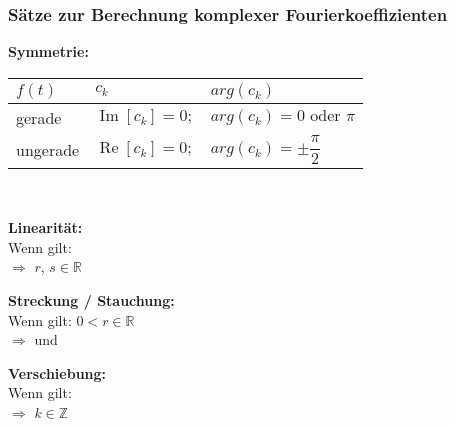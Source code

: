 			\subsubsection{Sätze zur Berechnung komplexer Fourierkoeffizienten}
				\begin{minipage}[t]{0.5\textwidth}
					\textbf{Symmetrie:}\\[3pt]
					\renewcommand{\arraystretch}{1.5}
						\begin{tabular}{|l|l|l|}
							\hline
							$f(t)$ & $c_k$ & $arg(c_k)$\\[3pt]
							\hline
							gerade & $\displaystyle \operatorname{Im}[c_k] = 0 ;$ & $\displaystyle arg(c_k) = 0 \text{ oder } \pi$\\[3pt]
							\hline
							ungerade & $\displaystyle \operatorname{Re}[c_k] = 0 ;$ & $\displaystyle arg(c_k) = \pm \dfrac{\pi}{2}$\\[3pt]
							\hline
						\end{tabular}\\[6pt]
					\renewcommand{\arraystretch}{1}
				\end{minipage}
				\begin{minipage}[t]{0.5\textwidth}
					\textbf{Linearität:}\\[3pt]
					Wenn gilt: \\[3pt]
					$\Rightarrow$  $r$, $s \in \mathbb{R}$\\[6pt]
				\end{minipage}
				\begin{minipage}[t]{0.5\textwidth}
					\textbf{Streckung / Stauchung:}\\[3pt]
					Wenn gilt:  $0 < r \in \mathbb{R}$\\[3pt]
					$\Rightarrow$  und 
				\end{minipage}
				\begin{minipage}[t]{0.5\textwidth}
					\textbf{Verschiebung:}\\[3pt]
					Wenn gilt: \\[3pt]
					$\Rightarrow$  $k \in \mathbb{Z}$
				\end{minipage}
			
